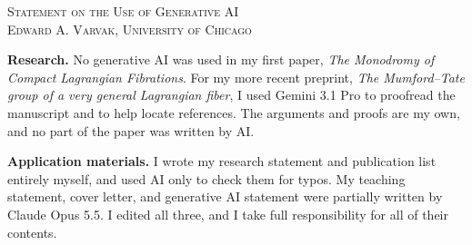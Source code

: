 \documentclass[12pt]{amsart}
\begin{document}
\thispagestyle{empty}

\begin{center}
  {\large\textsc{Statement on the Use of Generative AI}}\\[5pt]
  \small\textsc{Edward A. Varvak, University of Chicago}
\end{center}

\bigskip

\textbf{Research.} No generative AI was used in my first paper, \emph{The
Monodromy of Compact Lagrangian Fibrations}. For my more recent preprint, 
\emph{The Mumford--Tate group of a very general Lagrangian fiber}, 
I used Gemini 3.1 Pro to proofread the manuscript and to help locate references. 
The arguments and proofs are my own, and no part of the paper was written by AI.

\textbf{Application materials.} I wrote my research statement and publication
list entirely myself, and used AI only to check them for typos. My teaching
statement, cover letter, and generative AI statement were partially written by 
Claude Opus 5.5. I edited all three, and I take full responsibility for all of 
their contents. 
\end{document}
